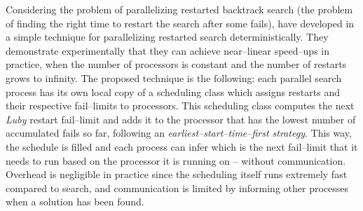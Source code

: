 Considering the problem of parallelizing restarted backtrack search (the problem of finding the right time to restart the search after some fails),  have developed in \cite{Cire2011} a simple technique for parallelizing restarted search deterministically. They demonstrate experimentally that they can achieve near--linear speed--ups in practice, when the number of processors is constant and the number of restarts grows to infinity. The proposed technique is the following: each parallel search process has its own local copy of a scheduling class which assigns restarts and their respective fail--limits to processors. This scheduling class computes the next {\it Luby} restart fail--limit and adds it to the processor that has the lowest number of accumulated fails so far, following an {\it earliest--start--time--first strategy}. This way, the schedule is filled and each process can infer which is the next fail--limit that it needs to run based on the processor it is running on -- without communication. Overhead is negligible in practice since the scheduling itself runs extremely fast compared to \cp{} search, and communication is limited by informing other processes when a solution has been found.